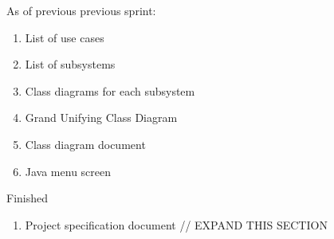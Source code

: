 \documentclass[12pt]{article}
\begin{document}
\begin{section}{As of previous previous sprint:}
\begin{enumerate}
\item List of use cases
\item List of subsystems
\item Class diagrams for each subsystem
\item Grand Unifying Class Diagram
\item Class diagram document
\item Java menu screen
\end{enumerate}
\end{section}

\begin{section}{Finished}
\begin{enumerate}
\item Project specification document
// EXPAND THIS SECTION
\end{enumerate}
\end{section}
\end{document}
